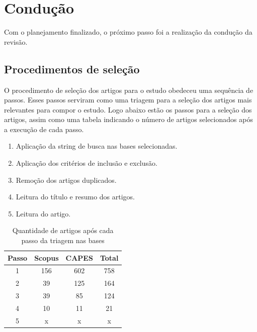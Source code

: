 \section{Condução}

Com o planejamento finalizado, o próximo passo foi a realização da condução da revisão.

\subsection{Procedimentos de seleção}

O procedimento de seleção dos artigos para o estudo obedeceu uma sequência de passos. Esses passos serviram como uma triagem para a seleção dos artigos mais relevantes para compor o estudo. Logo abaixo estão os passos para a seleção dos artigos, assim como uma tabela indicando o número de artigos selecionados após a execução de cada passo.

\begin{enumerate}
	\item Aplicação da string de busca nas bases selecionadas. %
	
	\item Aplicação dos critérios de inclusão e exclusão. %
	
	\item Remoção dos artigos duplicados. %
	
	\item Leitura do título e resumo dos artigos. %
	
	\item Leitura do artigo. %
\end{enumerate} 

\begin{table}[h!]
	\centering
	\label{tab:triagem}
	\begin{tabular}{|c|c|c|c|}
		\hline
		\textbf{Passo} & \textbf{Scopus} & \textbf{CAPES} & \textbf{Total} \\ \hline
		1 & 156 & 602 & 758\\ \hline
		2 & 39 & 125 & 164\\ \hline
		3 & 39 & 85 & 124\\ \hline
		4 & 10 & 11 & 21\\ \hline
		5 & x & x & x\\ \hline
	\end{tabular}
	\caption{Quantidade de artigos após cada passo da triagem nas bases}
\end{table}


